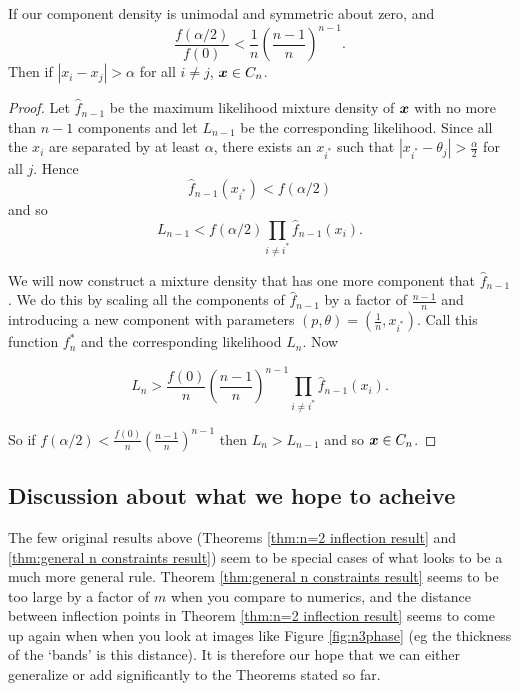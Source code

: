 		\begin{theorem}
			If our component density is unimodal and symmetric about zero, and
			$$\frac{f(\alpha/2)}{f(0)} < \frac{1}{n}\left(\frac{n-1}{n}\right)^{n-1}.$$
			Then if $|x_i - x_j| > \alpha$ for all $i\neq j$, ${\bm{{x}}} \in C_n$.
		\end{theorem}
		\begin{proof}
			Let $\hat{f}_{n-1}$ be the maximum likelihood mixture density of ${\bm{{x}}}$ with no more than $n-1$ components and let $L_{n-1}$ be the corresponding likelihood. Since all the $x_i$ are separated by at least $\alpha$, there exists an $x_{i^*}$ such that $|x_{i^*} - \theta_j|>\frac{\alpha}{2}$ for all $j$. Hence
			$$\hat{f}_{n-1}(x_{i^*}) < f(\alpha/2)$$
			and so
			$$L_{n-1} < f(\alpha/2) \prod_{i\neq i^*} \hat{f}_{n-1}(x_{i}).$$
			
			We will now construct a mixture density that has one more component that $\hat{f}_{n-1}$. We do this by scaling all the components of $\hat{f}_{n-1}$ by a factor of $\frac{n-1}{n}$ and introducing a new component with parameters $(p,\theta) = (\frac{1}{n},x_{i^*})$. Call this function $f^*_n$ and the corresponding likelihood $L_n$. Now
			
			$$L_n > \frac{f(0)}{n} \left(\frac{n-1}{n}\right)^{n-1}\prod_{i\neq i^*} \hat{f}_{n-1}(x_i).$$
			
			So if $f(\alpha/2) < \frac{f(0)}{n} \left(\frac{n-1}{n}\right)^{n-1}$ then $L_n > L_{n-1}$ and so ${\bm{{x}}} \in C_n$.
		\end{proof}

	\subsection{Discussion about what we hope to acheive}
		The few original results above (Theorems \ref{thm:n=2 inflection result} and \ref{thm:general n constraints result}) seem to be special cases of what looks to be a much more general rule. Theorem \ref{thm:general n constraints result} seems to be too large by a factor of $m$ when you compare to numerics, and the distance between inflection points in Theorem \ref{thm:n=2 inflection result} seems to come up again when when you look at images like Figure \ref{fig:n3phase} (eg the thickness of the `bands' is this distance). It is therefore our hope that we can either generalize or add significantly to the Theorems stated so far.